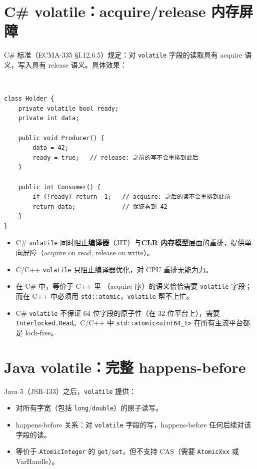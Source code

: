 \documentclass[12pt,a4paper,fontset=fandol]{ctexbook}
\newcommand{\csharplabel}{%
  \begin{tcolorbox}[enhanced,colback=csharpheadbg,colframe=csharpheadbg,
    arc=1mm,boxrule=0mm,left=6pt,right=6pt,top=2pt,bottom=2pt,
    halign=left,oversize]
    \textcolor{white}{\small\bfseries C\#}
  \end{tcolorbox}\vspace{-4pt}}
\newcommand{\cpp}[1]{C++#1}
\newcommand{\kw}[1]{\texttt{#1}}
\begin{document}
\section{C\# volatile：acquire/release 内存屏障}\label{sec:csharp-volatile}

C\# 标准（ECMA-335 §I.12.6.5）规定：对 \kw{volatile} 字段的读取具有 acquire 语义，写入具有 release 语义。具体效果：

\csharplabel
\begin{lstlisting}[style=csharpstyle]
class Holder {
    private volatile bool ready;
    private int data;

    public void Producer() {
        data = 42;
        ready = true;   // release: 之前的写不会重排到此后
    }

    public int Consumer() {
        if (!ready) return -1;   // acquire: 之后的读不会重排到此前
        return data;             // 保证看到 42
    }
}
\end{lstlisting}

\begin{tcolorbox}[compare={C\# volatile vs C++ volatile}]
\begin{itemize}[nosep]
  \item C\# \kw{volatile} 同时阻止\textbf{编译器}（JIT）与\textbf{CLR 内存模型}层面的重排，提供单向屏障（acquire on read, release on write）。
  \item C/\allowbreak{}\cpp{} \kw{volatile} 只阻止编译器优化，对 CPU 重排无能为力。
  \item 在 C\# 中，等价于 \cpp{} 里 （acquire 序）的语义恰恰需要 \kw{volatile} 字段；而在 \cpp{} 中必须用 \texttt{std::atomic}，\kw{volatile} 帮不上忙。
  \item C\# \kw{volatile} 不保证 64 位字段的原子性（在 32 位平台上），需要 \texttt{Interlocked.Read}。C/\allowbreak{}\cpp{} 中 \texttt{std::atomic<uint64\_t>} 在所有主流平台都是 lock-free。
\end{itemize}
\end{tcolorbox}

\section{Java volatile：完整 happens-before}\label{sec:java-volatile}

Java 5（JSR-133）之后，\kw{volatile} 提供：

\begin{itemize}[nosep]
  \item 对所有字宽（包括 \texttt{long}/\allowbreak{}\texttt{double}）的原子读写。
  \item happens-before 关系：对 \kw{volatile} 字段的写，happens-before 任何后续对该字段的读。
  \item 等价于 \texttt{AtomicInteger} 的 \texttt{get}/\allowbreak{}\texttt{set}，但不支持 CAS（需要 \texttt{AtomicXxx} 或 VarHandle）。
\end{itemize}
\end{document}
